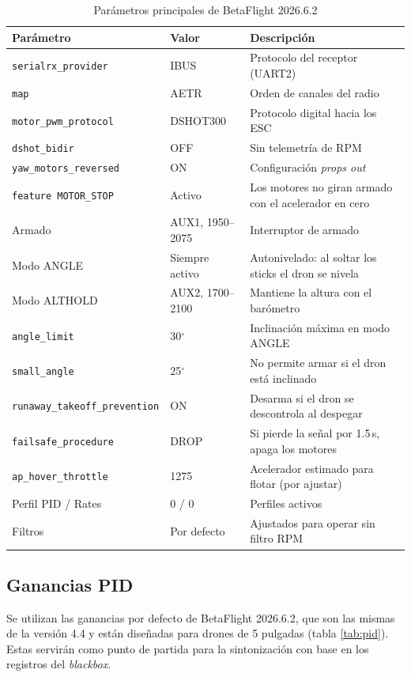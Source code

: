 \documentclass[11pt,letterpaper]{article}
\begin{document}
\begin{table}[!h]
\centering
\caption{Parámetros principales de BetaFlight 2026.6.2}
\label{tab:config}
\begin{tabularx}{\textwidth}{@{}llX@{}}
\toprule
\textbf{Parámetro} & \textbf{Valor} & \textbf{Descripción} \\
\midrule
\texttt{serialrx\_provider} & IBUS & Protocolo del receptor (UART2) \\
\texttt{map} & AETR & Orden de canales del radio \\
\texttt{motor\_pwm\_protocol} & DSHOT300 & Protocolo digital hacia los ESC \\
\texttt{dshot\_bidir} & OFF & Sin telemetría de RPM \\
\texttt{yaw\_motors\_reversed} & ON & Configuración \textit{props out} \\
\texttt{feature MOTOR\_STOP} & Activo & Los motores no giran armado con el acelerador en cero \\
Armado & AUX1, 1950--2075 & Interruptor de armado \\
Modo ANGLE & Siempre activo & Autonivelado: al soltar los sticks el dron se nivela \\
Modo ALTHOLD & AUX2, 1700--2100 & Mantiene la altura con el barómetro \\
\texttt{angle\_limit} & 30$^{\circ}$ & Inclinación máxima en modo ANGLE \\
\texttt{small\_angle} & 25$^{\circ}$ & No permite armar si el dron está inclinado \\
\texttt{runaway\_takeoff\_prevention} & ON & Desarma si el dron se descontrola al despegar \\
\texttt{failsafe\_procedure} & DROP & Si pierde la señal por 1.5\,s, apaga los motores \\
\texttt{ap\_hover\_throttle} & 1275 & Acelerador estimado para flotar (por ajustar) \\
Perfil PID / Rates & 0 / 0 & Perfiles activos \\
Filtros & Por defecto & Ajustados para operar sin filtro RPM \\
\bottomrule
\end{tabularx}
\end{table}

\subsection{Ganancias PID}
Se utilizan las ganancias por defecto de BetaFlight 2026.6.2, que son las mismas de la versión 4.4 y están diseñadas para drones de 5 pulgadas (tabla \ref{tab:pid}). Estas servirán como punto de partida para la sintonización con base en los registros del \textit{blackbox}.
\end{document}
